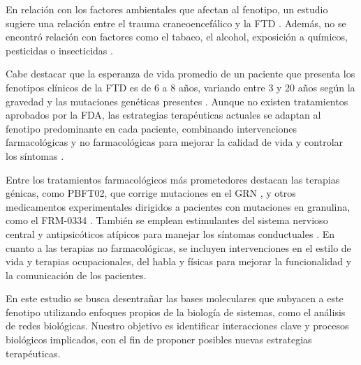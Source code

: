 En relación con los factores ambientales que afectan al fenotipo, un estudio sugiere una relación entre el trauma craneoencefálico y la FTD \cite{granadillo2008genetica, rosso2003medical}. Además, no se encontró relación con factores como el tabaco, el alcohol, exposición a químicos, pesticidas o insecticidas \cite{rosso2003medical}. 


Cabe destacar que la esperanza de vida promedio de un paciente que presenta los fenotipos clínicos de la FTD es de 6 a 8 años, variando entre 3 y 20 años según la gravedad y las mutaciones genéticas presentes \cite{Hodges2003}. Aunque no existen tratamientos aprobados por la FDA, las estrategias terapéuticas actuales se adaptan al fenotipo predominante en cada paciente, combinando intervenciones farmacológicas y no farmacológicas para mejorar la calidad de vida y controlar los síntomas \cite{SpringerLink2023}.

Entre los tratamientos farmacológicos más prometedores destacan las terapias génicas, como PBFT02, que corrige mutaciones en el GRN \cite{PassageBio2023}, y otros medicamentos experimentales dirigidos a pacientes con mutaciones en granulina, como el FRM-0334 \cite{MayoClinic2023}. También se emplean estimulantes del sistema nervioso central y antipsicóticos atípicos para manejar los síntomas conductuales \cite{NINDS2023}. En cuanto a las terapias no farmacológicas, se incluyen intervenciones en el estilo de vida y terapias ocupacionales, del habla y físicas para mejorar la funcionalidad y la comunicación de los pacientes.

En este estudio se busca desentrañar las bases moleculares que subyacen a este fenotipo utilizando enfoques propios de la biología de sistemas, como el análisis de redes biológicas. Nuestro objetivo es identificar interacciones clave y procesos biológicos implicados, con el fin de proponer posibles nuevas estrategias terapéuticas.


